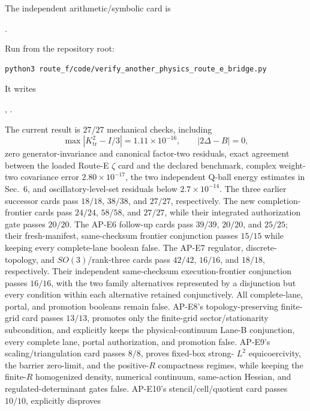 \documentclass[11pt]{article}
\numberwithin{equation}{section}
\newcommand{\Ktr}{K_{\mathrm{tr}}}
\begin{document}
The independent arithmetic/symbolic card is
\begin{center}
.
\end{center}
Run from the repository root:
\begin{verbatim}
python3 route_f/code/verify_another_physics_route_e_bridge.py
\end{verbatim}
It writes
\begin{center}
,\qquad
{}.
\end{center}
The current result is \(27/27\) mechanical checks, including
\begin{equation}
 \max|\Ktr^2-I/3|=1.11\times10^{-16},\qquad
 |2\Delta-B|=0,
\end{equation}
zero generator-invariance and canonical factor-two residuals, exact agreement
between the loaded Route-E \(\zeta\) card and the declared benchmark, complex
weight-two covariance error
\(2.80\times10^{-17}\), the two independent Q-ball energy estimates in
Sec.~6, and oscillatory-level-set residuals below \(2.7\times10^{-14}\).
The three earlier successor cards pass \(18/18\), \(38/38\), and \(27/27\),
respectively.  The new completion-frontier cards pass \(24/24\), \(58/58\),
and \(27/27\), while their integrated authorization gate passes \(20/20\).
The AP-E6 follow-up cards pass \(39/39\), \(20/20\), and \(25/25\);
their fresh-manifest, same-checksum frontier conjunction passes \(15/15\)
while keeping every complete-lane boolean false.
The AP-E7 regulator, discrete-topology, and \(SO(3)\)/rank-three cards pass
\(42/42\), \(16/16\), and \(18/18\), respectively.  Their independent
same-checksum execution-frontier conjunction passes \(16/16\), with the two
family alternatives represented by a disjunction but every condition within
each alternative retained conjunctively.  All complete-lane, portal, and
promotion booleans remain false.  AP-E8's topology-preserving finite-grid card
passes \(13/13\), promotes only the finite-grid sector/stationarity
subcondition, and explicitly keeps the physical-continuum Lane-B conjunction,
every complete lane, portal authorization, and promotion false.
AP-E9's scaling/triangulation card passes $8/8$, proves fixed-box strong-
$L^2$ equicoercivity, the barrier zero-limit, and the positive-$R$ compactness
regimes, while keeping the finite-$R$ homogenized density, numerical
continuum, same-action Hessian, and regulated-determinant gates false.
AP-E10's stencil/cell/quotient card passes $10/10$, explicitly disproves
\end{document}
